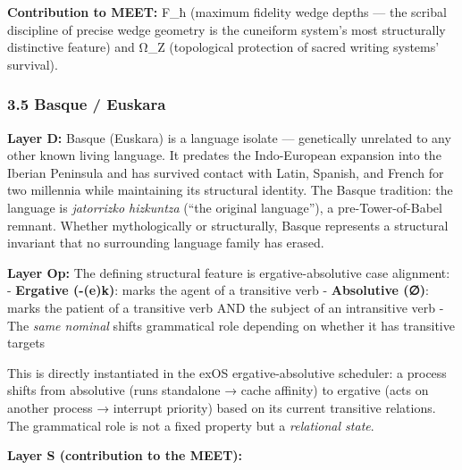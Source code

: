 \textbf{Contribution to MEET:} F\_ħ (maximum fidelity wedge depths ---
the scribal discipline of precise wedge geometry is the cuneiform
system's most structurally distinctive feature) and Ω\_Z (topological
protection of sacred writing systems' survival).

\subsubsection{3.5 Basque / Euskara}\label{basque-euskara}

\textbf{Layer D:} Basque (Euskara) is a language isolate --- genetically
unrelated to any other known living language. It predates the
Indo-European expansion into the Iberian Peninsula and has survived
contact with Latin, Spanish, and French for two millennia while
maintaining its structural identity. The Basque tradition: the language
is \emph{jatorrizko hizkuntza} (``the original language''), a
pre-Tower-of-Babel remnant. Whether mythologically or structurally,
Basque represents a structural invariant that no surrounding language
family has erased.

\textbf{Layer Op:} The defining structural feature is
ergative-absolutive case alignment: - \textbf{Ergative (-(e)k)}: marks
the agent of a transitive verb - \textbf{Absolutive (∅)}: marks the
patient of a transitive verb AND the subject of an intransitive verb -
The \emph{same nominal} shifts grammatical role depending on whether it
has transitive targets

This is directly instantiated in the exOS ergative-absolutive scheduler:
a process shifts from absolutive (runs standalone → cache affinity) to
ergative (acts on another process → interrupt priority) based on its
current transitive relations. The grammatical role is not a fixed
property but a \emph{relational state}.

\textbf{Layer S (contribution to the MEET):}

